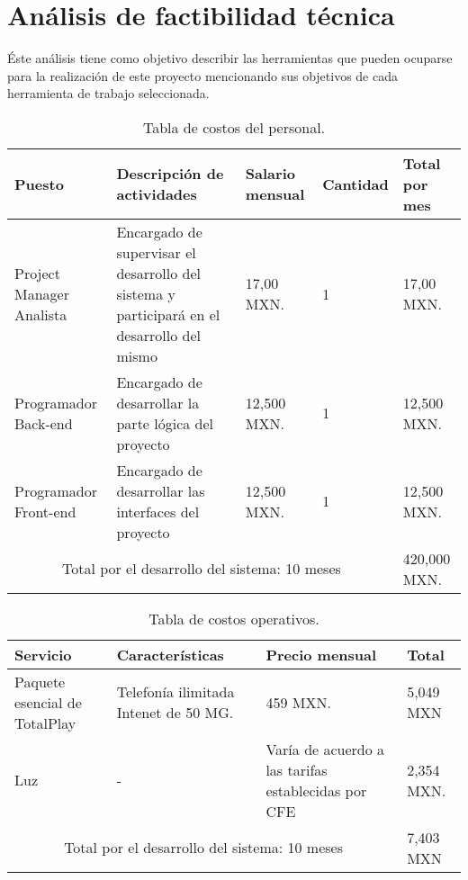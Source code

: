 	
	\section{An\'alisis de factibilidad t\'ecnica}
	\noindent Éste análisis tiene como objetivo describir las herramientas que pueden ocuparse para la realización de este proyecto mencionando sus objetivos de cada herramienta de trabajo seleccionada.
	
	\begin{table}[htbp]
		\begin{center}
			\begin{tabular}{|p{20mm}|p{30mm}|p{15mm}|p{15mm}|p{15mm}|}
				\hline
				\textbf{Puesto} & \textbf{Descripción de actividades} & \textbf{Salario mensual} & \textbf{Cantidad} & \textbf{Total por mes}\\ \hline 
				Project Manager Analista & Encargado de supervisar el desarrollo del sistema y participará en el desarrollo del mismo & 17,00 MXN. & 1 &17,00 MXN. \\ \hline
				
				Programador Back-end & Encargado de desarrollar la parte lógica del proyecto & 12,500 MXN. & 1 &12,500 MXN. \\ \hline
				
				Programador Front-end & Encargado de desarrollar las interfaces del proyecto & 12,500 MXN. & 1 &12,500 MXN.\\ \hline
				
				\multicolumn{4}{|c|}{Total por el desarrollo del sistema: 10 meses} & 420,000 MXN.\\ \hline
			\end{tabular}
			\caption{Tabla de costos del personal.}
			\label{tablacostopersonal}
		\end{center}
	\end{table}
	
	\begin{table}[htbp]
		\begin{center}
			\begin{tabular}{|p{20mm}|p{30mm}|p{15mm}|p{15mm}|}
				\hline
				\textbf{Servicio}  & \textbf{Características} & \textbf{Precio mensual} & \textbf{Total} \\ \hline 
				Paquete esencial de TotalPlay & Telefonía ilimitada Intenet de 50 MG. & 459 MXN. & 5,049 MXN \\ \hline
				
				Luz & - & Varía de acuerdo a las tarifas establecidas por CFE & 2,354 MXN. \\ \hline
				
				\multicolumn{3}{|c|}{Total por el desarrollo del sistema: 10 meses} & 7,403 MXN\\ \hline
			\end{tabular}
			\caption{Tabla de costos operativos.}
			\label{tablacostosoperativos}
		\end{center}
	\end{table}
\pagebreak
	
